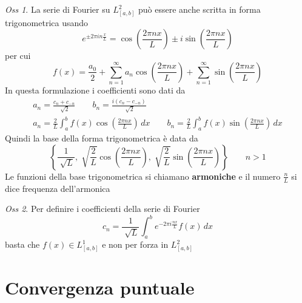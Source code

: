\documentclass[a4paper,11pt]{report}
\theoremstyle{remark}
\newtheorem*{oss}{Oss}
\theoremstyle{definition}
\begin{document}
\begin{oss}
	La serie di Fourier su $L^2_{[a,b]}$ può essere anche scritta in forma trigonometrica usando 
	\begin{equation*}
		e^{\pm 2\pi in \frac{x}{L}} = \cos{\left(\frac{2\pi nx}{L}\right)} \pm i\sin{\left(\frac{2\pi nx}{L}\right)}
	\end{equation*}
	per cui 
	\begin{equation*}
		f(x) = \frac{a_0}{2} + \sum_{n=1}^\infty a_n \cos{\left(\frac{2\pi nx}{L}\right)} + \sum_{n=1}^\infty \sin{\left(\frac{2\pi nx}{L}\right)}
	\end{equation*}
	In questa formulazione i coefficienti sono dati da 
	\begin{gather*}
		a_n = \frac{c_n + c_{-n}}{\sqrt[]{2}} \qquad b_n = \frac{i(c_n - c_{-n})}{\sqrt[]{2}} \\
		a_n = \frac{2}{L} \int_a^b f(x) \cos{\left(\frac{2\pi nx}{L}\right)} \, dx \qquad  b_n = \frac{2}{L} \int_a^b f(x) \sin{\left(\frac{2\pi nx}{L}\right)} \, dx 
	\end{gather*}
	Quindi la base della forma trigonometrica è data da 
	\begin{equation*}
		\left\{\frac{1}{\sqrt[]{L}}, \sqrt[]{\frac{2}{L}} \cos{\left(\frac{2\pi nx}{L}\right)}, \sqrt[]{\frac{2}{L}} \sin{\left(\frac{2\pi nx}{L}\right)}\right\} \qquad n>1
	\end{equation*}
	Le funzioni della base trigonometrica si chiamano \textbf{armoniche} e il numero $\frac{n}{L}$ si dice frequenza dell'armonica
\end{oss}

\begin{oss}
	Per definire i coefficienti della serie di Fourier 
	\begin{equation*}
		c_n = \frac{1}{\sqrt[]{L}} \int_a^b e^{-2\pi i \frac{nx}{L}} f(x) \, dx
	\end{equation*}
	basta che $f(x)\in L^1_{[a,b]}$ e non per forza in $L^2_{[a,b]}$
\end{oss}

\section{Convergenza puntuale}
\end{document}
